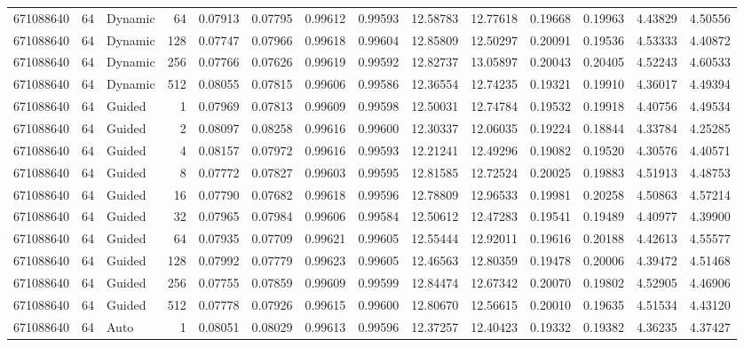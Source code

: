 \begin{tabular}{rrlrrrrrrrrrrr}
671088640 & 64 & Dynamic & 64 & 0.07913 & 0.07795 & 0.99612 & 0.99593 & 12.58783 & 12.77618 & 0.19668 & 0.19963 & 4.43829 & 4.50556 \\
671088640 & 64 & Dynamic & 128 & 0.07747 & 0.07966 & 0.99618 & 0.99604 & 12.85809 & 12.50297 & 0.20091 & 0.19536 & 4.53333 & 4.40872 \\
671088640 & 64 & Dynamic & 256 & 0.07766 & 0.07626 & 0.99619 & 0.99592 & 12.82737 & 13.05897 & 0.20043 & 0.20405 & 4.52243 & 4.60533 \\
671088640 & 64 & Dynamic & 512 & 0.08055 & 0.07815 & 0.99606 & 0.99586 & 12.36554 & 12.74235 & 0.19321 & 0.19910 & 4.36017 & 4.49394 \\
671088640 & 64 & Guided & 1 & 0.07969 & 0.07813 & 0.99609 & 0.99598 & 12.50031 & 12.74784 & 0.19532 & 0.19918 & 4.40756 & 4.49534 \\
671088640 & 64 & Guided & 2 & 0.08097 & 0.08258 & 0.99616 & 0.99600 & 12.30337 & 12.06035 & 0.19224 & 0.18844 & 4.33784 & 4.25285 \\
671088640 & 64 & Guided & 4 & 0.08157 & 0.07972 & 0.99616 & 0.99593 & 12.21241 & 12.49296 & 0.19082 & 0.19520 & 4.30576 & 4.40571 \\
671088640 & 64 & Guided & 8 & 0.07772 & 0.07827 & 0.99603 & 0.99595 & 12.81585 & 12.72524 & 0.20025 & 0.19883 & 4.51913 & 4.48753 \\
671088640 & 64 & Guided & 16 & 0.07790 & 0.07682 & 0.99618 & 0.99596 & 12.78809 & 12.96533 & 0.19981 & 0.20258 & 4.50863 & 4.57214 \\
671088640 & 64 & Guided & 32 & 0.07965 & 0.07984 & 0.99606 & 0.99584 & 12.50612 & 12.47283 & 0.19541 & 0.19489 & 4.40977 & 4.39900 \\
671088640 & 64 & Guided & 64 & 0.07935 & 0.07709 & 0.99621 & 0.99605 & 12.55444 & 12.92011 & 0.19616 & 0.20188 & 4.42613 & 4.55577 \\
671088640 & 64 & Guided & 128 & 0.07992 & 0.07779 & 0.99623 & 0.99605 & 12.46563 & 12.80359 & 0.19478 & 0.20006 & 4.39472 & 4.51468 \\
671088640 & 64 & Guided & 256 & 0.07755 & 0.07859 & 0.99609 & 0.99599 & 12.84474 & 12.67342 & 0.20070 & 0.19802 & 4.52905 & 4.46906 \\
671088640 & 64 & Guided & 512 & 0.07778 & 0.07926 & 0.99615 & 0.99600 & 12.80670 & 12.56615 & 0.20010 & 0.19635 & 4.51534 & 4.43120 \\
671088640 & 64 & Auto & 1 & 0.08051 & 0.08029 & 0.99613 & 0.99596 & 12.37257 & 12.40423 & 0.19332 & 0.19382 & 4.36235 & 4.37427 \\

\end{tabular}
